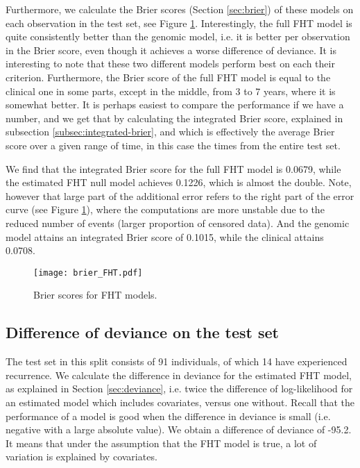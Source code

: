 Furthermore, we calculate the Brier scores (Section \ref{sec:brier}) of these models on each observation in the test set, see Figure \ref{fig:brier-FHT}.
Interestingly, the full FHT model is quite consistently better than the genomic model, i.e. it is better per observation in the Brier score, even though it achieves a worse difference of deviance.
It is interesting to note that these two different models perform best on each their criterion.
Furthermore, the Brier score of the full FHT model is equal to the clinical one in some parts, except in the middle, from 3 to 7 years, where it is somewhat better.
It is perhaps easiest to compare the performance if we have a number, and we get that by calculating the integrated Brier score, explained in subsection \ref{subsec:integrated-brier}, and which is effectively the average Brier score over a given range of time, in this case the times from the entire test set.

We find that the integrated Brier score for the full FHT model is 0.0679, while the estimated FHT null model achieves 0.1226, which is almost the double.
Note, however that large part of the additional error refers to the right part of the error curve (see Figure \ref{fig:brier-FHT}), where the computations are more unstable due to the reduced number of events (larger proportion of censored data).
And the genomic model attains an integrated Brier score of 0.1015, while the clinical attains 0.0708.

\begin{figure}
\caption{Brier scores for FHT models.}
\label{fig:brier-FHT}
\centering\texttt{[image: brier\_FHT.pdf]}
\end{figure}


\subsection{Difference of deviance on the test set}
The test set in this split consists of 91 individuals, of which 14 have experienced recurrence.
We calculate the difference in deviance for the estimated FHT model, as explained in Section \ref{sec:deviance}, i.e. twice the difference of log-likelihood for an estimated model which includes covariates, versus one without.
Recall that the performance of a model is good when the difference in deviance is small (i.e. negative with a large absolute value).
We obtain a difference of deviance of -95.2.
It means that under the assumption that the FHT model is true, a lot of variation is explained by covariates.

